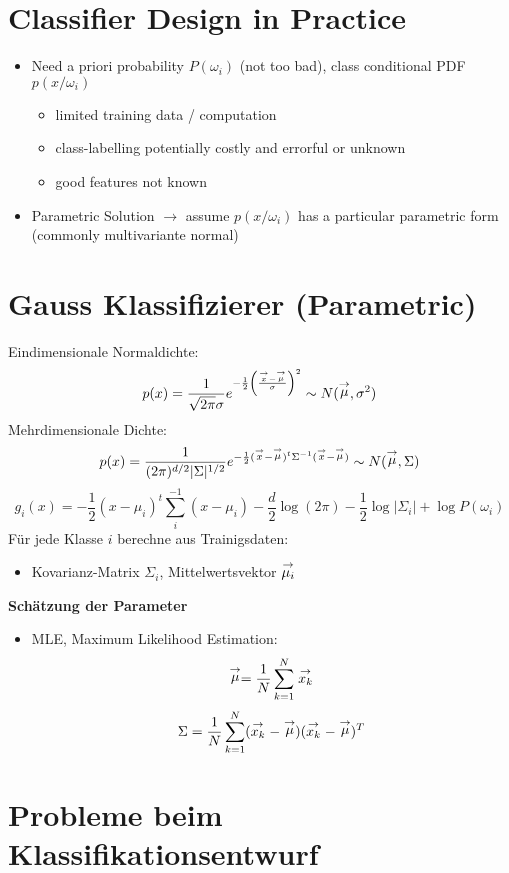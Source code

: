 \section{Classifier Design in Practice}
\begin{itemize}
	\item Need a priori probability $P(\omega_i)$ (not too bad), class conditional PDF $p(x/\omega_i)$
	\begin{itemize}
		\item limited training data / computation
		\item class-labelling potentially costly and errorful or unknown
		\item good features not known
	\end{itemize}
	\item Parametric Solution $\to$ assume $p(x/\omega_i)$ has a particular parametric form (commonly multivariante normal)
\end{itemize}

\section{Gauss Klassifizierer (Parametric)}

Eindimensionale Normaldichte: $$p(x) = \frac{1}{\sqrt{2\pi} \sigma} e^{- \frac{1}{2} \left( \frac{\stackrel{\to}{x} - \stackrel{\to}{\mu}}{\sigma} \right)^2} \sim N(\stackrel{\to}{\mu},\sigma^2)$$
Mehrdimensionale Dichte: $$p(x) = \frac{1}{(2\pi)^{d/2}|\Sigma|^{1/2}}e^{- \frac{1}{2} ( \stackrel{\to}{x} - \stackrel{\to}{\mu})^t \Sigma^{-1} (\stackrel{\to}{x} - \stackrel{\to}{\mu}) } \sim N(\stackrel{\to}{\mu},\Sigma)$$
$$g_i(x) = - \frac{1}{2} (x - \mu_i)^t \sum_i^{-1} (x - \mu_i) - \frac{d}{2} \log(2\pi) - \frac{1}{2} \log|\Sigma_i| + \log P(\omega_i)$$
Für jede Klasse $i$ berechne aus Trainigsdaten:
\begin{itemize}
\item Kovarianz-Matrix $\Sigma_i$, Mittelwertsvektor $\stackrel{\to}{\mu_i}$
\end{itemize}
\textbf{Schätzung der Parameter}
\begin{itemize}
\item MLE, Maximum Likelihood Estimation:
$$\stackrel{\to}{\mu} = \frac{1}{N} \sum\limits_{k=1}^N \stackrel{\to}{x_k}$$ $$\Sigma = \frac{1}{N} \sum\limits_{k=1}^N (\stackrel{\to}{x_k} - \stackrel{\to}{\mu})(\stackrel{\to}{x_k} - \stackrel{\to}{\mu})^T$$
\end{itemize}

\section{Probleme beim Klassifikationsentwurf}

